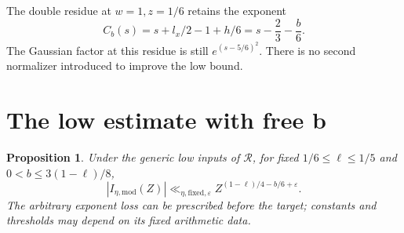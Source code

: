 \documentclass[11pt,a4paper]{article}
\newtheorem{proposition}[theorem]{Proposition}
\theoremstyle{definition}
\newcommand{\eps}{\varepsilon}
\begin{document}
The double residue at $w=1,z=1/6$ retains the exponent
\begin{equation}\label{eq:C}
 C_b(s)=s+l_x/2-1+h/6=s-\frac23-\frac b6.
\end{equation}
The Gaussian factor at this residue is still $e^{(s-5/6)^2}$.
There is no second normalizer introduced to improve the low bound.

\section{The low estimate with free b}
\label{sec:low}
\begin{proposition}\label{prop:low}
Under the generic low inputs of $\mathcal R$, for fixed
$1/6\le\ell\le1/5$ and $0<b\le3(1-\ell)/8$,
\[
 |I_{\eta,\mathrm{mod}}(Z)|
 \ll_{\eta,\mathrm{fixed},\eps}
 Z^{(1-\ell)/4-b/6+\eps}.
\]
The arbitrary exponent loss can be prescribed before the target;
constants and thresholds may depend on its fixed arithmetic data.
\end{proposition}
\end{document}

